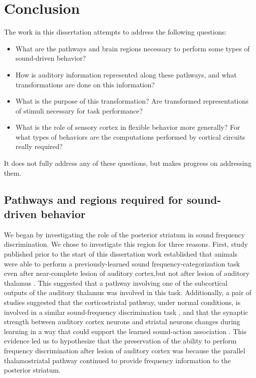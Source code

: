 \chapter{Conclusion}

The work in this dissertation attempts to address the following questions: 
\begin{itemize}
\item What are the pathways and brain regions necessary to perform some types of sound-driven behavior? 
\item How is auditory information represented along these pathways, and what transformations are done on this information?
\item What is the purpose of this transformation? Are transformed representations of stimuli necessary for task performance? 
\item What is the role of sensory cortex in flexible behavior more generally? For what types of behaviors are the computations performed by cortical circuits really required?
\end{itemize}

It does not fully address any of these questions, but makes progress on addressing them.

\section{Pathways and regions required for sound-driven behavior}
We began by investigating the role of the posterior striatum in sound frequency discrimination. 
%
We chose to investigate this region for three reasons. 
%
First, study published prior to the start of this dissertation work established that animals were able to perform a previously-learned sound frequency-categorization task even after near-complete lesion of auditory cortex,but not after lesion of auditory thalamus \citep{Gimenez2015}.
%
This suggested that a pathway involving one of the subcortical outputs of the auditory thalamus was involved in this task.
%
Additionally, a pair of studies suggested that the corticostriatal pathway, under normal conditions, is involved in a similar sound-frequency discrimination task \citep{Znamenskiy201}, and that the synaptic strength between auditory cortex neurons and striatal neurons changes during learning in a way that could support the learned sound-action association \citep{Xiong2015}.
%
This evidence led us to hypothesize that the preservation of the ability to perform frequency discrimination after lesion of auditory cortex was because the parallel thalamostriatal pathway continued to provide frequency information to the posterior striatum.

